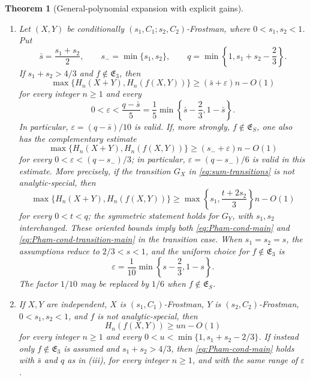\documentclass[11pt]{article}
\newtheorem{theorem}{Theorem}[section]
\begin{document}
\begin{theorem}[General-polynomial expansion with explicit gains]
\begin{enumerate}[label=\textup{(\roman*)}]
\item Let \((X,Y)\) be conditionally
\((s_1,C_1;s_2,C_2)\)-Frostman, where \(0<s_1,s_2<1\).  Put
\[
 \bar s=\frac{s_1+s_2}{2},\qquad
 s_-=\min\{s_1,s_2\},\qquad
 q=\min\left\{1,s_1+s_2-\frac{2}{3}\right\}.
\]
If \(s_1+s_2>4/3\) and \(f\notin\mathfrak E_3\), then
\begin{equation}
 \max\{H_n(X+Y),H_n(f(X,Y))\}
 \ge(\bar s+\varepsilon)n-O(1)
 \label{eq:Pham-cond-main}
\end{equation}
for every integer \(n\ge1\) and every
\[
 0<\varepsilon<\frac{q-\bar s}{5}
 =\frac{1}{5}\min\left\{\bar s-\frac{2}{3},1-\bar s\right\}.
\]
In particular, \(\varepsilon=(q-\bar s)/10\) is valid.  If, more strongly,
\(f\notin\mathfrak E_S\), one also has the complementary estimate
\begin{equation}
 \max\{H_n(X+Y),H_n(f(X,Y))\}
 \ge(s_-+\varepsilon)n-O(1)
 \label{eq:Pham-cond-transition-main}
\end{equation}
for every \(0<\varepsilon<(q-s_-)/3\); in particular,
\(\varepsilon=(q-s_-)/6\) is valid in this estimate.  More precisely, if
the transition \(G_X\) in \eqref{eq:sum-transitions} is not
analytic-special, then
\begin{equation}
 \max\{H_n(X+Y),H_n(f(X,Y))\}
 \ge\max\left\{s_1,\frac{t+2s_2}{3}\right\}n-O(1)
 \label{eq:Pham-cond-oriented}
\end{equation}
for every \(0<t<q\); the symmetric statement holds for \(G_Y\),
with \(s_1,s_2\) interchanged.  These oriented bounds imply both
\eqref{eq:Pham-cond-main} and
\eqref{eq:Pham-cond-transition-main} in the transition case.
When \(s_1=s_2=s\), the assumptions reduce to \(2/3<s<1\), and the
uniform choice for \(f\notin\mathfrak E_3\) is
\begin{equation}
 \varepsilon=\frac{1}{10}\min\left\{s-\frac{2}{3},1-s\right\}.
 \label{eq:Pham-cond-eps}
\end{equation}
The factor \(1/10\) may be replaced by \(1/6\) when
\(f\notin\mathfrak E_S\).

\item If \(X,Y\) are independent, \(X\) is
\((s_1,C_1)\)-Frostman, \(Y\) is \((s_2,C_2)\)-Frostman,
\(0<s_1,s_2<1\), and \(f\) is not analytic-special, then
\[
 H_n(f(X,Y))\ge u n-O(1)
\]
for every integer \(n\ge1\) and every
\(0<u<\min\{1,s_1+s_2-2/3\}\).  If instead only
\(f\notin\mathfrak E_3\) is assumed and \(s_1+s_2>4/3\), then
\eqref{eq:Pham-cond-main} holds with \(\bar s\) and \(q\) as in
\textup{(iii)}, for every integer \(n\ge1\), and with the same
range of \(\varepsilon\).
\end{enumerate}
\end{theorem}
\end{document}
